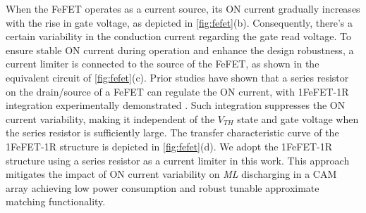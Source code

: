 
When the FeFET operates as a current source, its ON current gradually increases with the rise in gate voltage, as depicted in \autoref{fig:fefet}(b). Consequently, there's a certain variability in the conduction current regarding the gate read voltage. 
To ensure stable ON current during operation and enhance the design robustness, a current limiter is connected to the source of the FeFET, as shown in the equivalent circuit of \autoref{fig:fefet}(c).
Prior studies \cite{1FeFET1R-transfer, yin2023ultracompact} have shown that a series resistor on the drain/source of a FeFET can regulate the ON current, with 1FeFET-1R integration experimentally demonstrated \cite{area}. Such integration suppresses the ON current variability, making it independent of the $\textit{V}_\textit{TH}$ state and gate voltage when the series resistor is sufficiently large. 
The transfer characteristic curve of the 1FeFET-1R structure is depicted in \autoref{fig:fefet}(d).  
We adopt the 1FeFET-1R structure using a series resistor as a current limiter in this work. 
This approach mitigates the impact of ON current variability on \textit{ML} discharging in a CAM array 
achieving low power consumption and robust tunable approximate matching functionality.


